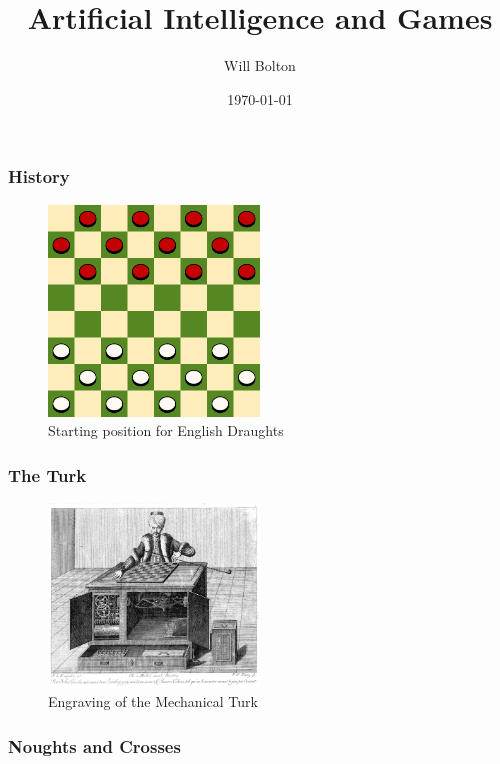 \documentclass{beamer}
\title[Artificial Intelligence and Games]{Artificial Intelligence and Games}
\author{Will Bolton}
\date{\today}
\begin{document}
\titlepage %

\begin{frame} %
\frametitle{History}
\begin{figure}
	\centering
	\includegraphics[width=0.5\textwidth]{images/draughts.png}
	\caption{Starting position for English Draughts \cite{draughts}}
	\label{draughts}
\end{figure}
\end{frame}

\begin{frame} %
\frametitle{The Turk}
\begin{figure}
	\centering
	\includegraphics[width=0.5\textwidth]{images/turk.jpg}
	\caption{Engraving of the Mechanical Turk \cite{turkdiagram}}
	\label{turk}
\end{figure}
\end{frame}

\begin{frame} %
\frametitle{Noughts and Crosses}
\begin{figure}
	\centering
\end{figure}
\end{frame}
\end{document}
